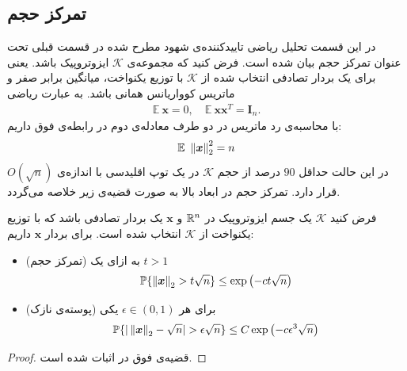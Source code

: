 \subsection{تمرکز حجم}
در این قسمت تحلیل ریاضی تایید‌کننده‌ی شهود مطرح شده در قسمت قبلی تحت عنوان تمرکز حجم 
بیان شده است.  فرض کنید که مجموعه‌ی
$\mathcal{K}$
ایزوتروپیک باشد. یعنی برای یک بردار تصادفی انتخاب شده از 
$\mathcal{K}$
با توزیع یکنواخت، میانگین برابر صفر و ماتریس کوواریانس همانی باشد. به عبارت ریاضی
\begin{align*}
\mathbb{E}~ \bm{x} = 0 , \quad \mathbb{E} ~\bm{x}\bm{x}^{T} = \bm{I}_{n}.
\end{align*}
با محاسبه‌ی رد ماتریس در دو طرف معادله‌ی دوم در رابطه‌ی فوق داریم:
\begin{align*}
\mathbb{E}~ \left\lVert\bm{x}\right\rVert_2^2 = n
\end{align*}
در این حالت حداقل
$90$
 درصد از حجم 
$\mathcal{K}$
 در یک توپ اقلیدسی با اندازه‌ی 
 $O(\sqrt{n})$
 قرار دارد.
 تمرکز حجم در ابعاد بالا به صورت قضیه‌ی زیر خلاصه می‌گردد.
\begin{theorem}
\label{theorem:thm2}
\cite[قضیه~3.2]{vershynin2015estimation}
فرض کنید
$\mathcal{K}$
یک جسم ایزوتروپیک در
$\mathbb{R}^{n}$
 و 
$\bm{x}$
یک بردار تصادفی باشد که با توزیع یکنواخت از 
$\mathcal{K}$
انتخاب شده است. برای بردار 
$\bm{x}$
داریم:
\begin{itemize}
\item{
(تمرکز حجم)
به ازای یک $t>1$ 
\begin{align}
\mathbb{P}\lbrace\left\lVert\bm{x}\right\rVert_{2}>t\sqrt{n} \rbrace \leq \exp\left( -ct\sqrt{n}\right)
\end{align}
}
\item{
(پوسته‌ی نازک)
برای هر 
$\epsilon \in (0,1)$
یکی 
\begin{align}
\mathbb{P}\lbrace\vert \left\lVert\bm{x}\right\rVert_{2}-\sqrt{n}\vert > \epsilon\sqrt{n} \rbrace \leq C \exp\left( -c\epsilon^{3}\sqrt{n}\right)
\end{align}
}
\end{itemize}
\end{theorem}
\begin{proof}
 قضیه‌ی فوق در 
\cite{paouris2006concentration}
اثبات شده است.
\end{proof}

